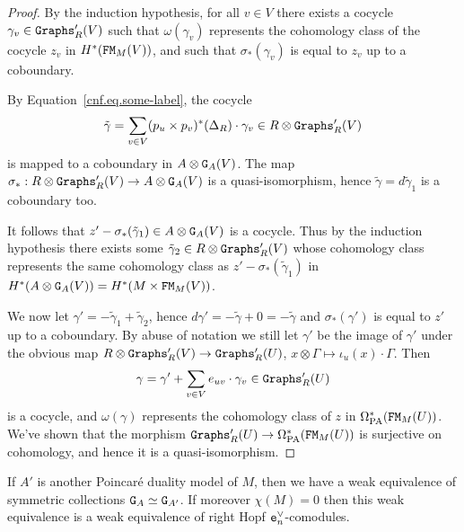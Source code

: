 \begin{proof}
  By the induction hypothesis, for all $v \in V$ there exists a cocycle $\gamma_{v} \in \mathtt{Graphs}'_{R}(V)$ such that $\omega(\gamma_{v})$ represents the cohomology class of the cocycle $z_{v}$ in $H^{*}(\mathtt{FM}_{M}(V))$, and such that $\sigma_{*}(\gamma_{v})$ is equal to $z_{v}$ up to a coboundary.

  By Equation~\eqref{cnf.eq.some-label}, the cocycle
  \[ \tilde\gamma = \sum_{v \in V} (p_{u} \times p_{v})^{*}(\Delta_{R}) \cdot \gamma_{v} \in R \otimes \mathtt{Graphs}'_{R}(V) \]
  is mapped to a coboundary in $A \otimes \mathtt{G}_{A}(V)$.
  The map $\sigma_{*} : R \otimes \mathtt{Graphs}'_{R}(V) \to A \otimes \mathtt{G}_{A}(V)$ is a quasi-isomorphism, hence $\tilde\gamma = d \tilde\gamma_{1}$ is a coboundary too.

  It follows that $z' - \sigma_{*}(\tilde\gamma_{1}) \in A \otimes \mathtt{G}_{A}(V)$ is a cocycle.
  Thus by the induction hypothesis there exists some $\tilde\gamma_{2} \in R \otimes \mathtt{Graphs}'_{R}(V)$ whose cohomology class represents the same cohomology class as $z' - \sigma_{*}(\tilde\gamma_{1})$ in $H^{*}(A \otimes \mathtt{G}_{A}(V)) = H^{*}(M \times \mathtt{FM}_{M}(V))$.

  We now let $\gamma' = -\tilde\gamma_{1} + \tilde\gamma_{2}$, hence $d\gamma' = -\tilde\gamma + 0 = - \tilde\gamma$ and $\sigma_{*}(\gamma')$ is equal to $z'$ up to a coboundary.
  By abuse of notation we still let $\gamma'$ be the image of $\gamma'$ under the obvious map $R \otimes \mathtt{Graphs}'_{R}(V) \to \mathtt{Graphs}'_{R}(U)$, $x \otimes \Gamma \mapsto \iota_{u}(x) \cdot \Gamma$.
  Then
  \[ \gamma = \gamma' + \sum_{v \in V} e_{uv} \cdot \gamma_{v} \in \mathtt{Graphs}'_{R}(U) \]
  is a cocycle, and $\omega(\gamma)$ represents the cohomology class of $z$ in $\Omega_{\mathrm{PA}}^{*}(\mathtt{FM}_{M}(U))$.
  We've shown that the morphism $\mathtt{Graphs}'_{R}(U) \to \Omega_{\mathrm{PA}}^{*}(\mathtt{FM}_{M}(U))$ is surjective on cohomology, and hence it is a quasi-isomorphism.
\end{proof}

\begin{proposition}
  \label{cnf.prop.ga-gb}
  If $A'$ is another Poincaré duality model of $M$, then we have a weak equivalence of symmetric collections $\mathtt{G}_{A} \simeq \mathtt{G}_{A'}$.
  If moreover $\chi(M) = 0$ then this weak equivalence is a weak equivalence of right Hopf $\mathtt{e}_{n}^{\vee}$-comodules.
\end{proposition}

